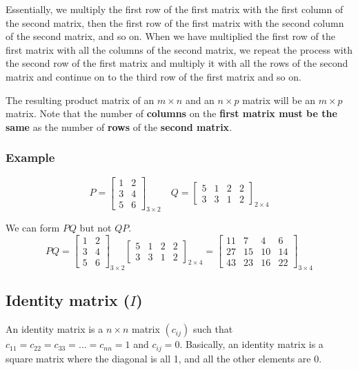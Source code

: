 \documentclass[11pt]{article}
\begin{document}
Essentially, we multiply the first row of the first matrix with the first column of the second matrix, then the first row of the first matrix with the second column of the second matrix, and so on. When we have multiplied the first row of the first matrix with all the columns of the second matrix, we repeat the process with the second row of the first matrix and multiply it with all the rows of the second matrix and continue on to the third row of the first matrix and so on.

The resulting product matrix of an \(m \times n\) and an \(n \times p\) matrix will be an \(m \times p\) matrix. Note that the number of \textbf{columns} on the \textbf{first matrix must be the same} as the number of \textbf{rows} of the \textbf{second matrix}.

\subsubsection{Example}
\label{sec:orge61a144}
\begin{displaymath}
P = \begin{bmatrix}
1 & 2 \\
3 & 4 \\
5 & 6
\end{bmatrix}_{3 \times 2} \quad Q = \begin{bmatrix}
5 & 1 & 2 & 2 \\
3 & 3 & 1 & 2
\end{bmatrix}_{2 \times 4}
\end{displaymath}

We can form \(PQ\) but not \(QP\).
\begin{displaymath}
PQ = \begin{bmatrix}
1 & 2 \\
3 & 4 \\
5 & 6
\end{bmatrix}_{3 \times 2} \begin{bmatrix}
5 & 1 & 2 & 2 \\
3 & 3 & 1 & 2
\end{bmatrix}_{2 \times 4} = \begin{bmatrix}
11 & 7 & 4 & 6 \\
27 & 15 & 10 & 14 \\
43 & 23 & 16 & 22
\end{bmatrix}_{3 \times 4}
\end{displaymath}

\subsection{Identity matrix (\(I\))}
\label{sec:org6938726}
An identity matrix is a \(n \times n\) matrix \((c_{ij})\) such that \(c_{11} = c_{22} = c_{33} = \ldots = c_{nn} = 1\) and \(c_{ij} = 0\). Basically, an identity matrix is a square matrix where the diagonal is all 1, and all the other elements are 0.
\end{document}

